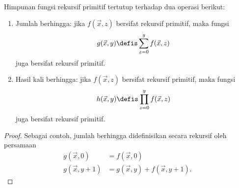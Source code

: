 \documentclass[../../../include/open-logic-section]{subfiles}
\begin{document}
\begin{prop}
Himpunan fungsi rekursif primitif tertutup terhadap dua operasi berikut:
\begin{enumerate}
\item Jumlah berhingga: jika $f(\vec x, z)$ bersifat rekursif primitif, maka
fungsi
\[
g(\vec x, y) \defis \sum_{z = 0}^y f(\vec x, z)
\]
juga bersifat rekursif primitif.
\item Hasil kali berhingga: jika $f(\vec x, z)$ bersifat rekursif primitif,
maka fungsi
\[
h(\vec x, y) \defis \prod_{z = 0}^y f(\vec x, z)
\]
juga bersifat rekursif primitif.
\end{enumerate}
\end{prop}

\begin{proof}
Sebagai contoh, jumlah berhingga didefinisikan secara rekursif oleh persamaan
\begin{align*}
  g(\vec x, 0) & = f(\vec x, 0)\\
  g(\vec x, y+1) & = g(\vec x, y) + f(\vec x, y+1).
\end{align*}
\end{proof}
\end{document}
